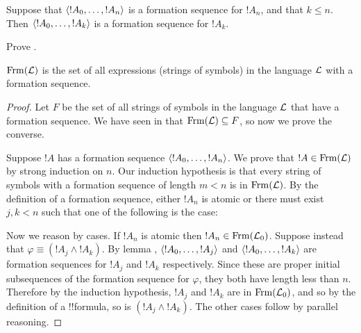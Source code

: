 \documentclass[../../../include/open-logic-section]{subfiles}
\begin{document}
\begin{lem}
Suppose that $\langle !A_0,\dotsc,!A_n \rangle$ is a formation sequence
for $!A_n$, and that $k \leq n$. Then $\langle !A_0,\dotsc,!A_k \rangle$
is a formation sequence for $!A_k$.
\end{lem}

\begin{prob}
Prove .
\end{prob}

\begin{thm}
$\Frm[L]$ is the set of all expressions (strings of symbols)
in the language $\Lang L$ with a formation sequence.
\end{thm}

\begin{proof}
Let $F$ be the set of all strings of symbols in the language
$\Lang L$ that have a formation sequence. We have seen in
 that $\Frm[L] \subseteq F$,
so now we prove the converse.

Suppose $!A$ has a formation sequence $\langle !A_0,\dotsc,!A_n \rangle$.
We prove that $!A \in \Frm[L]$ by strong induction on $n$.
Our induction hypothesis is that every string of symbols with a
formation sequence of length $m < n$ is in $\Frm[L]$.
By the definition of a formation sequence, either $!A_n$ is
atomic or there must exist $j,k < n$ such that one of the
following is the case:
\begin{enumerate}
\end{enumerate}
Now we reason by cases. If $!A_n$ is atomic then
$!A_n \in \Frm[L_0]$. Suppose instead that
$\varphi \equiv (!A_j \land !A_k)$. By lemma
,
$\langle !A_0,\dotsc,!A_j \rangle$ and $\langle !A_0,\dotsc,!A_k \rangle$ are
formation sequences for $!A_j$ and $!A_k$ respectively. Since
these are proper initial subsequences of the formation sequence
for $\varphi$, they both have length less than $n$. Therefore by
the induction hypothesis, $!A_j$ and $!A_k$ are in $\Frm[L_0]$,
and so by the definition of a !!{formula}, so is
$(!A_j \land !A_k)$. The other cases follow by parallel
reasoning.
\end{proof}
\end{document}
